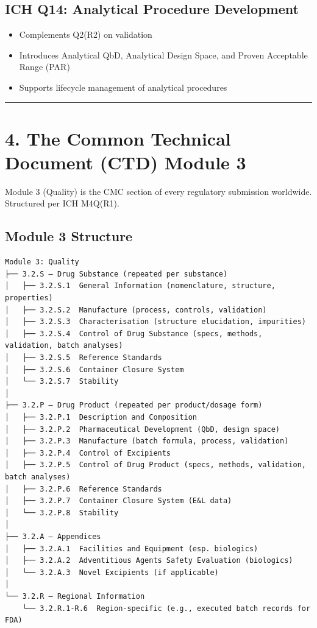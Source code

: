 \documentclass[
  11pt,
  a4paper,
]{report}
\providecommand{\tightlist}{%
  \setlength{\itemsep}{0pt}\setlength{\parskip}{0pt}}
\begin{document}
\hypertarget{ich-q14-analytical-procedure-development}{%
\subsection{ICH Q14: Analytical Procedure
Development}\label{ich-q14-analytical-procedure-development}}

\begin{itemize}
\tightlist
\item
  Complements Q2(R2) on validation
\item
  Introduces Analytical QbD, Analytical Design Space, and Proven
  Acceptable Range (PAR)
\item
  Supports lifecycle management of analytical procedures
\end{itemize}

\begin{center}\rule{0.5\linewidth}{0.5pt}\end{center}

\hypertarget{the-common-technical-document-ctd-module-3}{%
\section{4. The Common Technical Document (CTD) Module
3}\label{the-common-technical-document-ctd-module-3}}

Module 3 (Quality) is the CMC section of every regulatory submission
worldwide. Structured per ICH M4Q(R1).

\hypertarget{module-3-structure}{%
\subsection{Module 3 Structure}\label{module-3-structure}}

\begin{verbatim}
Module 3: Quality
├── 3.2.S — Drug Substance (repeated per substance)
│   ├── 3.2.S.1  General Information (nomenclature, structure, properties)
│   ├── 3.2.S.2  Manufacture (process, controls, validation)
│   ├── 3.2.S.3  Characterisation (structure elucidation, impurities)
│   ├── 3.2.S.4  Control of Drug Substance (specs, methods, validation, batch analyses)
│   ├── 3.2.S.5  Reference Standards
│   ├── 3.2.S.6  Container Closure System
│   └── 3.2.S.7  Stability
│
├── 3.2.P — Drug Product (repeated per product/dosage form)
│   ├── 3.2.P.1  Description and Composition
│   ├── 3.2.P.2  Pharmaceutical Development (QbD, design space)
│   ├── 3.2.P.3  Manufacture (batch formula, process, validation)
│   ├── 3.2.P.4  Control of Excipients
│   ├── 3.2.P.5  Control of Drug Product (specs, methods, validation, batch analyses)
│   ├── 3.2.P.6  Reference Standards
│   ├── 3.2.P.7  Container Closure System (E&L data)
│   └── 3.2.P.8  Stability
│
├── 3.2.A — Appendices
│   ├── 3.2.A.1  Facilities and Equipment (esp. biologics)
│   ├── 3.2.A.2  Adventitious Agents Safety Evaluation (biologics)
│   └── 3.2.A.3  Novel Excipients (if applicable)
│
└── 3.2.R — Regional Information
    └── 3.2.R.1-R.6  Region-specific (e.g., executed batch records for FDA)
\end{verbatim}
\end{document}
